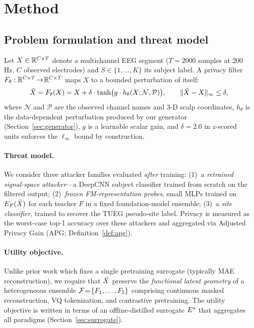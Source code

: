 \section{Method}
\label{sec:method}

\subsection{Problem formulation and threat model}
\label{sec:formulation}

Let $X \in \mathbb{R}^{C \times T}$ denote a multichannel EEG segment ($T\!=\!2000$ samples at 200\,Hz, $C$ observed electrodes) and $S \in \{1,\ldots,K\}$ its subject label. A privacy filter $F_\theta:\mathbb{R}^{C\times T}\!\to\!\mathbb{R}^{C\times T}$ maps $X$ to a bounded perturbation of itself:
\begin{equation}
\tilde{X} = F_\theta(X) = X + \delta\cdot\tanh\bigl(g\cdot h_\theta(X;\mathcal{N},\mathcal{P})\bigr),\qquad
\|\tilde{X} - X\|_\infty \le \delta,
\label{eq:filter}
\end{equation}
where $\mathcal{N}$ and $\mathcal{P}$ are the observed channel names and 3-D scalp coordinates, $h_\theta$ is the data-dependent perturbation produced by our generator (Section~\ref{sec:generator}), $g$ is a learnable scalar gain, and $\delta\!=\!2.0$ in $z$-scored units enforces the $\ell_\infty$ bound by construction.

\paragraph{Threat model.} We consider three attacker families evaluated \emph{after} training:
(1)~a \emph{retrained signal-space attacker}---a DeepCNN subject classifier trained from scratch on the filtered output; (2)~\emph{frozen FM-representation probes}, small MLPs trained on $E_F(\tilde{X})$ for each teacher $F$ in a fixed foundation-model ensemble; (3)~a \emph{site classifier}, trained to recover the TUEG pseudo-site label. Privacy is measured as the worst-case top-1 accuracy over these attackers and aggregated via Adjusted Privacy Gain (APG; Definition~\ref{def:apg}).

\paragraph{Utility objective.} Unlike prior work which fixes a single pretraining surrogate (typically MAE reconstruction), we require that $\tilde{X}$ preserve the \emph{functional latent geometry} of a heterogeneous ensemble $\mathcal{F}\!=\!\{F_1,\ldots,F_5\}$ comprising continuous masked reconstruction, VQ tokenization, and contrastive pretraining. The utility objective is written in terms of an offline-distilled surrogate $E^{\star}$ that aggregates all paradigms (Section~\ref{sec:surrogate}).

